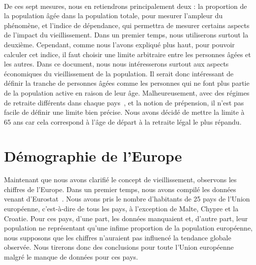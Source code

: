 \paragraph{} De ces sept mesures, nous en retiendrons principalement deux : la proportion de la population âgée dans la population totale, pour mesurer l’ampleur du phénomène, et l’indice de dépendance, qui permettra de mesurer certains aspects de l’impact du vieillissement. Dans un premier temps, nous utiliserons surtout la deuxième. Cependant, comme nous l’avons expliqué plus haut, pour pouvoir calculer cet indice, il faut choisir une limite arbitraire entre les personnes âgées et les autres. Dans ce document, nous nous intéresserons surtout aux aspects économiques du vieillissement de la population. Il serait donc intéressant de définir la tranche de personnes âgées comme les personnes qui ne font plus partie de la population active en raison de leur âge. Malheureusement, avec des régimes de retraite différents dans chaque pays~\citep{age_retraite}, et la notion de prépension, il n’est pas facile de définir une limite bien précise. Nous avons décidé de mettre la limite à 65 ans car cela correspond à l’âge de départ à la retraite légal le plus répandu. 

\section{Démographie de l'Europe}
\paragraph{}Maintenant que nous avons clarifié le concept de vieillissement, observons les chiffres de l’Europe. Dans un premier temps, nous avons compilé les données venant d'Eurostat~\citep{eurostat_pop}. Nous avons pris le nombre d’habitants de 25 pays de l’Union européenne, c’est-à-dire de tous les pays, à l’exception de Malte, Chypre et la Croatie. Pour ces pays, d'une part, les données manquaient et, d'autre part, leur population ne représentant qu'une infime proportion de la population européenne, nous supposons que les chiffres n’auraient pas influencé la tendance globale observée. Nous tirerons donc des conclusions pour toute l’Union européenne malgré le manque de données pour ces pays.

